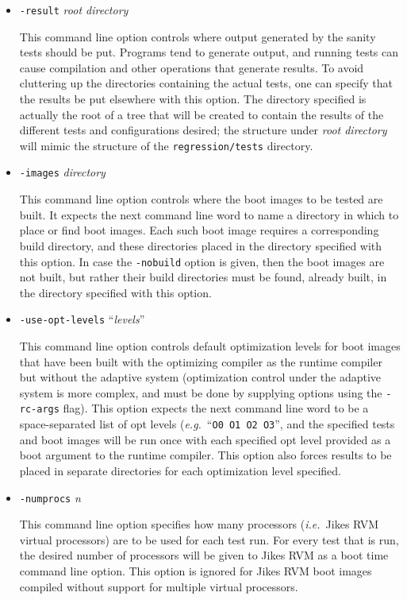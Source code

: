 \begin{itemize}
\item{\tt{-result}} {\em root directory}

 This command line option controls where output generated by the
sanity tests should be put.  Programs tend to generate output, and
running tests can cause compilation and other operations that generate
results.  To avoid cluttering up the directories containing the actual
tests, one can specify that the results be put elsewhere with this
option.  The directory specified is actually the root of a tree that
will be created to contain the results of the different tests and
configurations desired; the structure under {\em root
directory} will mimic the structure of the \texttt{regression/tests} directory. 

\item{\tt{-images}} {\em directory}

 This command line option controls where the boot images to be tested
are built. It expects the next command line word to name a directory
in which to place or find boot images. Each such boot image requires a
corresponding build directory, and these directories placed in the
directory specified with this option.  In case the {\tt -nobuild}
option is given, then the boot images are not built, but rather their
build directories must be found, already built, in the directory
specified with this option.

\item{\tt{-use-opt-levels}} ``{\em levels}''

 This command line option controls default optimization levels for
boot images that have been built with the optimizing compiler as the
runtime compiler but without the adaptive system (optimization control
under the adaptive system is more complex, and must be done by
supplying options using the {\tt -rc-args} flag).  This option expects
the next command line word to be a space-separated list of opt levels
({\it e.g.}\ ``\texttt{O0 O1 O2 O3}'', and the specified tests and boot images will be run once with
each specified opt level provided as a boot argument to the runtime
compiler.  This option also forces results to be placed in separate
directories for each optimization level specified.

\item{\tt{-numprocs}} {\em n}

 This command line option specifies how many processors ({\it i.e.}\ Jikes\TMweb{}
RVM virtual processors) are to be used for each test run.  For every
test that is run, the desired number of processors will be given to
Jikes RVM as a boot time command line option.  This option is ignored
for Jikes RVM boot images compiled without support for multiple
virtual processors.


\end{itemize}
